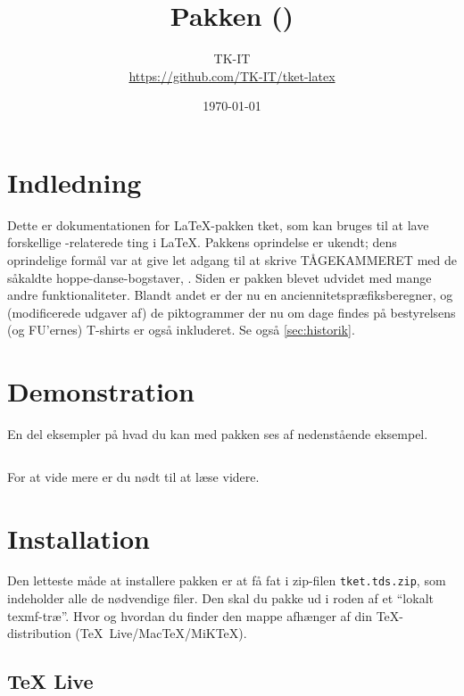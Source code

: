 \documentclass[a4paper,article,oneside,danish]{memoir}
\title{Pakken \ptket (\pTKETVer)}
\author{TK-IT\\\url{https://github.com/TK-IT/tket-latex}}
\date{\today}
\newcommand{\pakkenavn}[1]{\textsf{#1}}
\newcommand{\ptket}{\pakkenavn{tket}\xspace}
\newcommand{\filnavn}[1]{\texttt{#1}}
\newcommand{\mdframedinputminted}[2]{\begin{mdframed}[style=kodestyle]\inputminted{#1}{#2}\end{mdframed}}
\begin{document}
\maketitle


\tableofcontents*

\chapter{Indledning}
\label{cha:indledning}

Dette er dokumentationen for \LaTeX-pakken \ptket, som kan bruges til
at lave forskellige \TK-relaterede ting i \LaTeX. Pakkens oprindelse
er ukendt; dens oprindelige formål var at give let adgang til at
skrive \hbox{TÅGEKAMMERET} med de såkaldte hoppe-danse-bogstaver,
\TKET. Siden er pakken blevet udvidet med mange andre
funktionaliteter. Blandt andet er der nu en
anciennitetspræfiksberegner, og (modificerede udgaver af) de
piktogrammer der nu om dage findes på bestyrelsens (og FU'ernes)
T-shirts er også inkluderet. Se også \vref{sec:historik}.

\chapter{Demonstration}
\label{cha:demonstration}

En del eksempler på hvad du kan med pakken ses af nedenstående
eksempel.
\mdframedinputminted{latex}{eksempel-demo.tex}

\begin{resultat}

\end{resultat}

For at vide mere er du nødt til at læse videre.

\chapter{Installation}
\label{cha:installation}

Den letteste måde at installere pakken er at få fat i zip-filen
\filnavn{tket.tds.zip}, som indeholder alle de nødvendige filer. Den
skal du pakke ud i roden af et \enquote{lokalt texmf-træ}. Hvor og hvordan du
finder den mappe afhænger af din \TeX-distribution (\mbox{\TeX{}
  Live}/\mbox{Mac\TeX}/\mbox{MiK\TeX}).

\section{\TeX{} Live}
\label{sec:tex-live}
\end{document}

